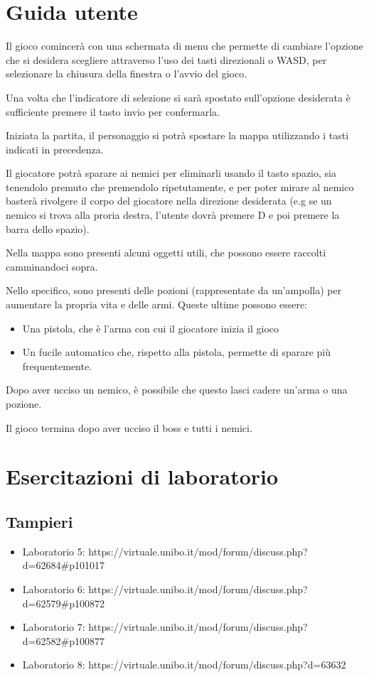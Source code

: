 \documentclass[a4paper,12pt]{report}
\begin{document}
    \chapter{Guida utente}
    \par Il gioco comincerà con una schermata di menu che permette di cambiare l'opzione che si desidera scegliere attraverso l'uso
     dei tasti direzionali o  WASD, per selezionare la chiusura della finestra o l'avvio del gioco.
    \par Una volta che l'indicatore di selezione si sarà spostato sull'opzione desiderata è sufficiente premere il tasto invio per confermarla.
    \par Iniziata la partita, il personaggio si potrà spostare la mappa utilizzando i tasti indicati in precedenza.
    \par Il giocatore potrà sparare ai nemici per eliminarli usando il tasto spazio, sia tenendolo premuto che premendolo ripetutamente,
     e per poter mirare al nemico basterà rivolgere il corpo del giocatore nella direzione desiderata (e.g se un nemico si trova alla
     proria destra, l'utente dovrà premere D e poi premere la barra dello spazio).
     \par Nella mappa sono presenti alcuni oggetti utili, che possono essere raccolti camminandoci sopra.
     \par Nello specifico, sono presenti delle pozioni (rappresentate da un'ampolla) per aumentare la propria vita e delle armi. Queste ultime possono essere:
     \begin{itemize}
         \item Una pistola, che è l'arma con cui il giocatore inizia il gioco
         \item Un fucile automatico che, rispetto alla pistola, permette di sparare più frequentemente.
     \end{itemize}
     \par Dopo aver ucciso un nemico, è possibile che questo lasci cadere un'arma o una pozione.
    \par Il gioco termina dopo aver ucciso il boss e tutti i nemici.
    \chapter{Esercitazioni di laboratorio}
    \section{Tampieri}
    \begin{itemize}
        \item Laboratorio 5: https://virtuale.unibo.it/mod/forum/discuss.php?d=62684\#p101017
        \item Laboratorio 6: https://virtuale.unibo.it/mod/forum/discuss.php?d=62579\#p100872
        \item Laboratorio 7: https://virtuale.unibo.it/mod/forum/discuss.php?d=62582\#p100877
        \item Laboratorio 8: https://virtuale.unibo.it/mod/forum/discuss.php?d=63632
    \end{itemize}
    \printbibliography[heading=bibintoc]
\end{document}
